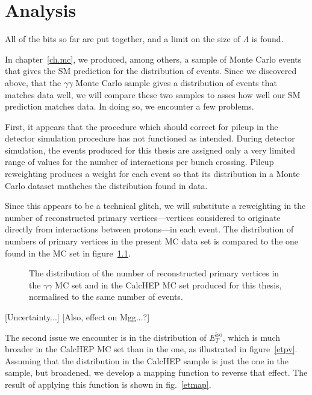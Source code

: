 \chapter{Analysis}
All of the bits so far are put together, and a limit on the size of
$\Lambda$ is found.

In chapter~\ref{ch.mc}, we produced, among others, a sample of Monte Carlo events that gives the SM prediction for the distribution of events. Since we discovered above, that the \atlas{} $\gamma\gamma$ Monte Carlo sample gives a distribution of events that matches data well, we will compare these two samples to asses how well our SM prediction matches data. In doing so, we encounter a few problems.

First, it appears that the procedure which should correct for pileup in the detector simulation procedure has not functioned as intended. During detector simulation, the events produced for this thesis are assigned only a very limited range of values for the number of interactions per bunch crossing. Pileup reweighting produces a weight for each event so that its distribution in a Monte Carlo dataset mathches the distribution found in data.

Since this appears to be a technical glitch, we will substitute a reweighting in the number of reconstructed primary vertices---vertices considered to originate directly from interactions between protons---in each event. The distribution of numbers of primary vertices in the present MC data set is compared to the one found in the \atlas{} MC set in figure~\ref{pvnnone}.

\begin{figure}[htp]
\begin{minipage}[b]{.69\textwidth}
\begin{infilsf} \tiny

\end{infilsf}
\end{minipage}
\begin{minipage}[b]{.3\textwidth}
\caption{The distribution of the number of reconstructed primary vertices in the \atlas{} $\gamma\gamma$ MC set and in the CalcHEP MC set produced for this thesis, normalised to the same number of events.}\label{pvnnone}
\end{minipage}
\end{figure}

[Uncertainty...] [Also, effect on Mgg...?]

The second issue we encounter is in the distribution of $E_T^\text{iso}$, which is much broader in the CalcHEP MC set than in the \atlas{} one, as illustrated in figure~\ref{etpv}. Assuming that the distribution in the CalcHEP sample is just the one in the \atlas{} sample, but broadened, we develop a mapping function to reverse that effect. The result of applying this function is shown in fig.~\ref{etmap}.

